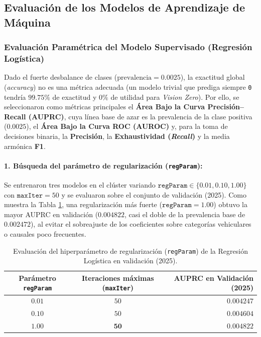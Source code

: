 \documentclass[11pt,a4paper]{article}
\begin{document}
\subsection{Evaluación de los Modelos de Aprendizaje de Máquina}
\label{subsec:evaluacion_modelos_num6}

\subsubsection{Evaluación Paramétrica del Modelo Supervisado (Regresión Logística)}

Dado el fuerte desbalance de clases ($\text{prevalencia} = 0.0025$), la exactitud global (\textit{accuracy}) no es una métrica adecuada (un modelo trivial que prediga siempre \texttt{0} tendría $99.75\%$ de exactitud y $0\%$ de utilidad para \textit{Vision Zero}). Por ello, se seleccionaron como métricas principales el \textbf{Área Bajo la Curva Precisión--Recall (AUPRC)}, cuya línea base de azar es la prevalencia de la clase positiva ($0.0025$), el \textbf{Área Bajo la Curva ROC (AUROC)} y, para la toma de decisiones binaria, la \textbf{Precisión}, la \textbf{Exhaustividad (\textit{Recall})} y la media armónica \textbf{F1}.

\paragraph{1. Búsqueda del parámetro de regularización (\texttt{regParam}):}
Se entrenaron tres modelos en el clúster variando $\texttt{regParam} \in \{0.01, 0.10, 1.00\}$ con $\texttt{maxIter} = 50$ y se evaluaron sobre el conjunto de validación (2025). Como muestra la Tabla \ref{tab:lr_regparam}, una regularización más fuerte ($\texttt{regParam} = 1.00$) obtuvo la mayor AUPRC en validación ($0.004822$, casi el doble de la prevalencia base de $0.002472$), al evitar el sobreajuste de los coeficientes sobre categorías vehiculares o causales poco frecuentes.

\begin{table}[H]
\centering
\small
\renewcommand{\arraystretch}{1.2}
\caption{Evaluación del hiperparámetro de regularización (\texttt{regParam}) de la Regresión Logística en validación (2025).}
\label{tab:lr_regparam}
\begin{tabular}{c c r}
\toprule
\textbf{Parámetro \texttt{regParam}} & \textbf{Iteraciones máximas (\texttt{maxIter})} & \textbf{AUPRC en Validación (2025)} \\
\midrule
$0.01$ & $50$ & $0.004247$ \\
$0.10$ & $50$ & $0.004604$ \\
$\mathbf{1.00}$ & $\mathbf{50}$ & $\mathbf{0.004822}$ \\
\bottomrule
\end{tabular}
\end{table}
\end{document}
